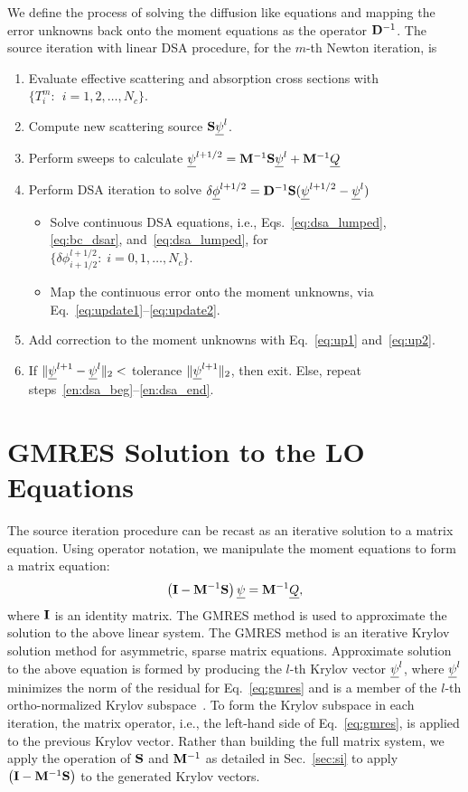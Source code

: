 We define the process of solving the diffusion like equations and mapping the error
unknowns back onto the moment equations as the operator $\mathbf{D}^{-1}$.
The source iteration with linear DSA procedure, for the $m$-th Newton iteration, is
\begin{enumerate}
    \item Evaluate effective scattering and absorption cross sections with
        ${\{T^m_i:\;\, i=1,2,\ldots,N_c\}}$.
    \item\label{en:dsa_beg} Compute new scattering source $\mathbf{S} \underline{\psi}^l$.
    \item Perform sweeps to calculate $\underline{\psi}^{l+1/2} = \mathbf{M}^{-1} \mathbf{S} \underline{\psi}^{l} + \mathbf{M}^{-1} \underline{Q}$
    \item Perform DSA iteration to solve $ \delta \underline{\phi}^{l+1/2} = \mathbf{D}^{-1}
        \mathbf{S}(\underline{\psi}^{l+1/2}-\underline{\psi}^l)$
        \begin{itemize}
    \item Solve continuous DSA equations, i.e., Eqs.~\eqref{eq:dsa_lumped}, \eqref{eq:bc_dsar},
and~\eqref{eq:dsa_lumped}, for \\${\{\delta
            \phi^{l+1/2}_{i+1/2}:\;i=0,1,\ldots,N_c\}}$.
        \item Map the continuous error onto the moment unknowns, via
            Eq.~\eqref{eq:update1}--\eqref{eq:update2}.
    \end{itemize}
\item Add correction to the moment unknowns with Eq.~\eqref{eq:up1} and~\eqref{eq:up2}.
    \item\label{en:dsa_end} If $\|\underline{\psi}^{l+1} - \underline{\psi}^{l} \|_2 < $ tolerance $\|\underline{\psi}^{l+1} \|_2$, then
        exit. Else, repeat steps~\ref{en:dsa_beg}--\ref{en:dsa_end}.
\end{enumerate}

\section{GMRES Solution to the LO Equations}

The source iteration procedure can be recast as an iterative solution to a matrix
equation. Using operator notation, we manipulate
the moment equations to form a matrix equation:
\begin{equation}\label{eq:gmres}
    \left(\mathbf{I}  - \mathbf{M}^{-1}\mathbf{S}\right) \underline{\psi} = \mathbf{M}^{-1} \underline{Q},
\end{equation}
where $\mathbf{I}$ is an identity matrix.  The GMRES method is used to approximate
the solution to the above
linear system. The GMRES method is an iterative Krylov solution method for asymmetric, sparse matrix
equations.  Approximate solution to the above equation is formed by producing the $l$-th
Krylov vector $\underline{\psi}^l$, where $\underline{\psi}^l$ minimizes the norm of the residual for
Eq.~\eqref{eq:gmres} and is a member of the $l$-th ortho-normalized Krylov
subspace~\cite{saad}.  To form the Krylov subspace in each iteration, the
matrix operator, i.e., the left-hand side of Eq.~\eqref{eq:gmres}, is applied to the
previous Krylov vector.  Rather than building the full matrix system, we apply the
operation of $\mathbf{S}$ and $\mathbf{M}^{-1}$ as detailed in Sec.~\eqref{sec:si} to apply $\left(\mathbf{I}  - \mathbf{M}^{-1}\mathbf{S}\right)$ to the generated Krylov vectors. 

